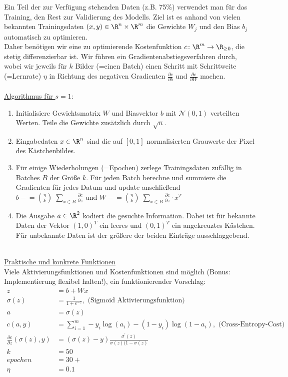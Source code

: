 Ein Teil der zur Verfügung stehenden Daten (z.B. 75\%) verwendet man für das Training, den Rest zur Validierung des Modells.
Ziel ist es anhand von vielen bekannten Trainingsdaten $(x,y)\in \R^n \times \R^m$ die Gewichte $W_j$ und den Bias $b_j$ automatisch zu optimieren.\\
Daher benötigen wir eine zu optimierende Kostenfunktion $c\colon \R^m \to \R_{\ge 0}$, die stetig differenzierbar ist. Wir führen ein Gradientenabstiegsverfahren durch, wobei wir jeweils für $k$ Bilder (=einen Batch) einen Schritt mit Schrittweite (=Lernrate) $\eta$ in Richtung des negativen Gradienten $\frac{\partial c}{\partial b}$ und $\frac{\partial c}{\partial W}$ machen.\\\\
\underline{Algorithmus für $s=1$}:
\begin{enumerate}
 \item Initialisiere Gewichtsmatrix $W$ und Biasvektor $b$ mit $\mathcal{N}(0,1)$ verteilten Werten. Teile die Gewichte zusätzlich durch $\sqrt{n}$.
 \item Eingabedaten $x\in\R^n$ sind die auf $[0,1]$ normalisierten Grauwerte der Pixel des Kästchenbildes.
 \item Für einige Wiederholungen (=Epochen) zerlege Trainingsdaten zufällig in Batches $B$ der Größe $k$. Für jeden Batch berechne und summiere die Gradienten für jedes Datum und update anschließend \\
 $b \mathrel{-}= (\frac{\eta}{k})\;\sum_{x\in B}\frac{\partial c}{\partial z}$ und 
 $W \mathrel{-}= (\frac{\eta}{k})\;\sum_{x\in B}\frac{\partial c}{\partial z} \cdot x^T$\
\item Die Ausgabe $a\in\R^2$ kodiert die gesuchte Information. Dabei ist für bekannte Daten der Vektor $(1,0)^T$ ein leeres und $(0,1)^T$ ein angekreuztes Kästchen. Für unbekannte Daten ist der größere der beiden Einträge ausschlaggebend.
\end{enumerate}
\\
\underline{Praktische und konkrete Funktionen}\\
Viele Aktivierungsfunktionen und Kostenfunktionen sind möglich (Bonus: Implementierung flexibel halten!), ein funktionierender Vorschlag:
\begin{align*}
z&=b+Wx\\
\sigma(z)&=\frac{1}{1+e^{-z}}, \text{ (Sigmoid Aktivierungsfunktion)}\\
a&=\sigma(z)\\
c(a,y)&=\sum_{i=1}^m -y_i\log(a_i) -(1-y_i)\log(1-a_i), \text{ (Cross-Entropy-Cost)}\\
\frac{\partial c}{\partial z}(\sigma(z),y)&=(\sigma(z) - y)\frac{\sigma^\prime(z)}{\sigma(z)(1-\sigma(z)}\\
k&=50\\
epochen&=30+\\
\eta&=0.1
\end{align*}